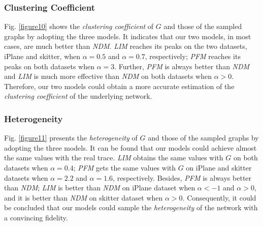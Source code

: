\documentclass[a4paper]{llncs}
\begin{document}
\subsubsection{Clustering Coefficient}
Fig. \ref{figure10} shows the {\it clustering coefficient} of $G$ and those of the sampled graphs by adopting the three models. It indicates that our two models, in most cases, are much better than \textit{NDM}. \textit{LIM} reaches its peaks on the two datasets, iPlane and skitter, when $\alpha = 0.5$ and $\alpha = 0.7$, respectively; \textit{PFM} reaches its peaks on both datasets when $\alpha=3$. Further, \textit{PFM} is always better than \textit{NDM} and \textit{LIM} is much more effective than \textit{NDM} on both datasets when $\alpha > 0$. Therefore, our two models could obtain a more accurate estimation of the {\it clustering coefficient} of the underlying network.

\begin{figure*}[!t]
\centering
{}
\hspace{2em}
\vspace{-1.7em}
\caption{The {\it heterogeneity} of the sampled graphs by using the three models, compared with that of $G$, on two real datasets: iPlane and skitter, respectively.}
\label{figure11}
\vspace{-0.5em}
\end{figure*}


\subsubsection{Heterogeneity}
Fig. \ref{figure11} presents the {\it heterogeneity} of $G$
and those of the sampled graphs by adopting the three models. It can be found that
our models could achieve almost the same values with the real trace. \textit{LIM} obtains the same values with $G$ on both datasets when $\alpha = 0.4$; \textit{PFM} gets the same values with $G$ on iPlane and skitter datasets when $\alpha=2.2$ and $\alpha=1.6$, respectively. Besides, \textit{PFM} is always better than \textit{NDM}; \textit{LIM} is better
than \textit{NDM} on iPlane dataset when $\alpha < -1$ and $\alpha > 0$, and it is better than \textit{NDM} on
skitter dataset when $\alpha > 0$. Consequently, it could be concluded that
our models could sample the {\it heterogeneity} of the network with a convincing fidelity.
\end{document}
